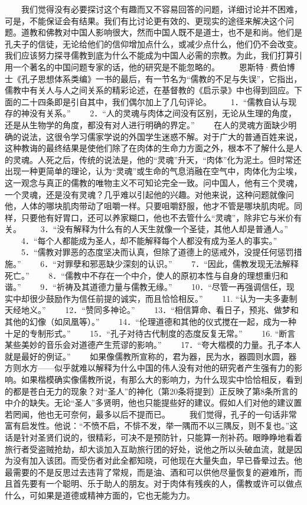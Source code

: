 \documentclass[12pt,oneside]{book}
\begin{document}
\begin{common-format}
　　我们觉得没有必要探讨这个有趣而又不容易回答的问题，详细讨论并不困难，可是，不能保证会有结果。我们有比讨论更有效的、更现实的途径来解决这个问题。道教和佛教对中国人影响很大，然而中国人既不是道士，也不是和尚。他们是孔夫子的信徒，无论给他们的信仰增加点什么，或减少点什么，他们仍不会改变。我们应该努力探寻儒教到底为什么不能成为中国人必需的宗教。为此，我们打算引用一个著名的中国问题专家的话，他的研究是不能忽略的。 
　　恩斯特·费伯博士《孔子思想体系类编》一书的最后，有一节名为“儒教的不足与失误”，它指出，儒教中有关人与人之间关系的精彩论述，在基督教的《启示录》中也得到回应。下面的二十四条即是引自其中，我们偶尔加上了几句评论。 
　　1．“儒教自认与现存的神没有关系。” 
　　2．“人的灵魂与肉体之间没有区别，无论从生理的角度，还是从生物学的角度，都没有对人进行明确的界定。” 
　　在人的灵魂方面缺少明确的说法，这很令学习儒家学说的外国学生迷惑不解。对于广大的普通百姓来说，这种教诲的最终结果是使他们除了在肉体的生命力方面之外，根本不了解什么是人的灵魂。人死之后，传统的说法是，他的“灵魂”升天，“肉体”化为泥土。但时常还出现一种更简单的理论，认为“灵魂”或生命的气息消融在空气中，肉体化为尘埃，这一观念与真正的儒教的唯物主义不可知论完全一致。问中国人，他有三个灵魂，一个灵魂，还是没有灵魂？几乎难以引起他的兴趣。对他来说，这种问题就像问他，人体的哪块肌肉带动了咀嚼一样。只要咀嚼舒服，他才不管是哪块肌肉呢。同样，只要他有好胃口，还可以养家糊口，他也不去管什么“灵魂”，除非它与米价有关。 
　　3．“没有解释为什么有的人天生就像一个圣徒，其他人却是普通人。” 
　　4．“每个人都能成为圣人，却不能解释每个人都没有成为圣人的事实。” 
　　5．“儒教对罪恶的态度坚决而认真，但除了道德上的惩戒外，没提任何惩罚措施。” 
　　6．“对罪孽和邪恶缺少深刻的认识。” 
　　7．“因此，儒教发现无法解释死亡。” 
　　8．“儒教中不存在一个中介，使人的原初本性与自身的理想重归和谐。” 
　　9．“祈祷及其道德力量与儒教无缘。” 
　　10．“尽管一再强调信任，现实中却很少鼓励作为信任前提的诚实，而且恰恰相反。” 
　　11. “认为一夫多妻制天经地义。” 
　　12．“赞同多神论。” 
　　13．“相信算命、看日子，预兆、做梦和其他的幻像（如凤凰等）。” 
　　14．“伦理道德和其他的仪式搅在一起，成为一种十足的专制形式。” 
　　15．“孔子对待古代制度的态度反复无常。” 
　　16. “断言某些美妙的音乐会对道德产生荒谬的影响。” 
　　17．“夸大楷模的力量。孔子本人就是最好的例证。” 
　　如果像儒教所宣称的，君为器，民为水，器圆则水圆，器方则水方——似乎就难以解释为什么中国的伟人没有对他的研究者产生强有力的影响。如果楷模确实像儒教所说，有那么大的影响力，为什么现实中恰恰相反，看到的都是苍白无力的现象？对“圣人”的神化（第20条将提到）正反映了第8条所言的中介的缺失。无论“圣人”多贤明，他也只能提些好的建议。假如人们对他的建议置若罔闻，他也无可奈何，最多以后不提而已。 
　　我们觉得，孔子的一句话非常富有启发性。他说：“不愤不启，不悱不发，举一隅而不以三隅反，则不复也。”这话是针对圣贤们说的，很精彩，可决不是预防针，只能算一剂补药。眼睁睁地看着旅行者受盗贼抢劫，却大谈加入互助旅行团的好处，说他之所以头破血流，就是因为没有加入该团。而受伤者对此全都知晓，可他现在大量失血，早已昏晕过去。他最需要的不是反思过去违背了常规，而是油、酒和可以供他尽量恢复的避难所，而且首先要有一个聪明、乐于助人的朋友。对于肉体有残疾的人，儒教或许可以做点什么，可如果是道德或精神方面的，它也无能为力。 

\end{common-format}
\end{document}
